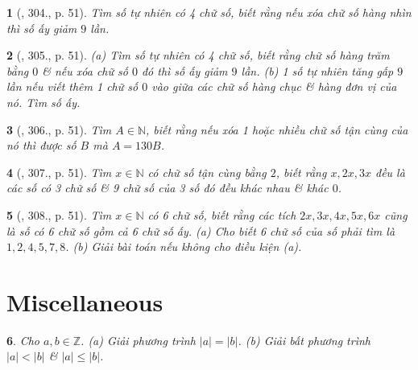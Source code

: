 \documentclass{article}
\newtheorem{baitoan}{}
\begin{document}
\begin{baitoan}[\cite{Binh_Toan_6_tap_1}, 304., p. 51]
	Tìm số tự nhiên có 4 chữ số, biết rằng nếu xóa chữ số hàng nhìn thì số ấy giảm $9$ lần.
\end{baitoan}

\begin{baitoan}[\cite{Binh_Toan_6_tap_1}, 305., p. 51]
	(a) Tìm số tự nhiên có 4 chữ số, biết rằng chữ số hàng trăm bằng $0$ \& nếu xóa chữ số $0$ đó thì số ấy giảm $9$ lần. (b) 1 số tự nhiên tăng gấp $9$ lần nếu viết thêm 1 chữ số $0$ vào giữa các chữ số hàng chục \& hàng đơn vị của nó. Tìm số ấy.
\end{baitoan}

\begin{baitoan}[\cite{Binh_Toan_6_tap_1}, 306., p. 51]
	Tìm $A\in\mathbb{N}$, biết rằng nếu xóa 1 hoặc nhiều chữ số tận cùng của nó thì được số $B$ mà $A = 130B$.
\end{baitoan}

\begin{baitoan}[\cite{Binh_Toan_6_tap_1}, 307., p. 51]
	Tìm $x\in\mathbb{N}$ có chữ số tận cùng bằng $2$, biết rằng $x,2x,3x$ đều là các số có 3 chữ số \& 9 chữ số của 3 số đó đều khác nhau \& khác $0$.
\end{baitoan}

\begin{baitoan}[\cite{Binh_Toan_6_tap_1}, 308., p. 51]
	Tìm $x\in\mathbb{N}$ có 6 chữ số, biết rằng các tích $2x,3x,4x,5x,6x$ cũng là số có 6 chữ số gồm cả 6 chữ số ấy. (a) Cho biết 6 chữ số của số phải tìm là $1,2,4,5,7,8$. (b) Giải bài toán nếu không cho điều kiện (a).
\end{baitoan}


\section{Miscellaneous}

\begin{baitoan}
	Cho $a,b\in\mathbb{Z}$. (a) Giải phương trình $|a| = |b|$. (b) Giải bất phương trình $|a| < |b|$ \& $|a|\le|b|$.
\end{baitoan}


\printbibliography[heading=bibintoc]
\end{document}

